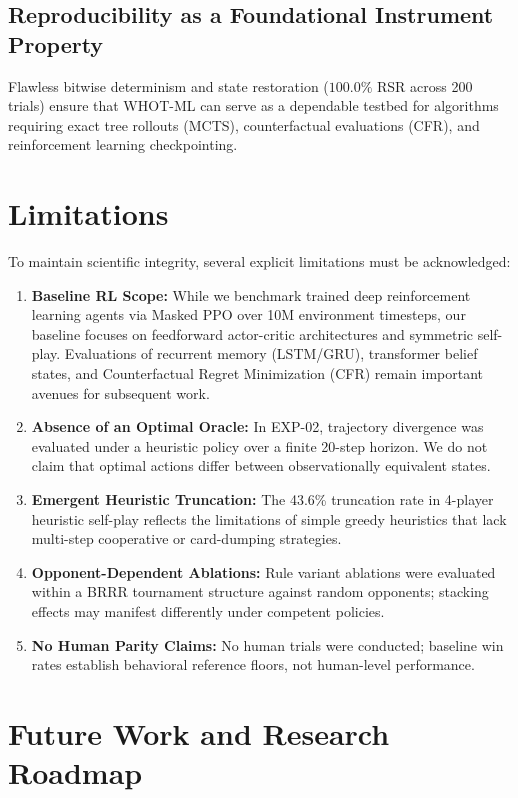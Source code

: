\documentclass[11pt]{article}
\begin{document}
\subsection{Reproducibility as a Foundational Instrument Property}
Flawless bitwise determinism and state restoration ($100.0\%$ RSR across 200 trials) ensure that WHOT-ML can serve as a dependable testbed for algorithms requiring exact tree rollouts (MCTS), counterfactual evaluations (CFR), and reinforcement learning checkpointing.


\section{Limitations}

To maintain scientific integrity, several explicit limitations must be acknowledged:
\begin{enumerate}
  \item \textbf{Baseline RL Scope:} While we benchmark trained deep reinforcement learning agents via Masked PPO over 10M environment timesteps, our baseline focuses on feedforward actor-critic architectures and symmetric self-play. Evaluations of recurrent memory (LSTM/GRU), transformer belief states, and Counterfactual Regret Minimization (CFR) remain important avenues for subsequent work.
  \item \textbf{Absence of an Optimal Oracle:} In EXP-02, trajectory divergence was evaluated under a heuristic policy over a finite 20-step horizon. We do not claim that optimal actions differ between observationally equivalent states.
  \item \textbf{Emergent Heuristic Truncation:} The 43.6\% truncation rate in 4-player heuristic self-play reflects the limitations of simple greedy heuristics that lack multi-step cooperative or card-dumping strategies.
  \item \textbf{Opponent-Dependent Ablations:} Rule variant ablations were evaluated within a BRRR tournament structure against random opponents; stacking effects may manifest differently under competent policies.
  \item \textbf{No Human Parity Claims:} No human trials were conducted; baseline win rates establish behavioral reference floors, not human-level performance.
\end{enumerate}


\section{Future Work and Research Roadmap}
\end{document}
